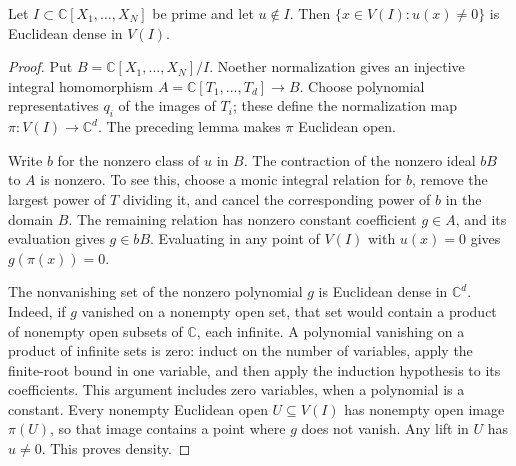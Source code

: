 \begin{lemma}
\label{lem:complex-closure-principal-density}
\leanok
Let $I\subset\mathbb C[X_1,\ldots,X_N]$ be prime and let $u\notin I$.
Then $\{x\in V(I):u(x)\ne0\}$ is Euclidean dense in $V(I)$.
\end{lemma}
\begin{proof}
Put $B=\mathbb C[X_1,\ldots,X_N]/I$. Noether normalization gives an
injective integral homomorphism $A=\mathbb C[T_1,\ldots,T_d]\to B$.
Choose polynomial representatives $q_i$ of the images of $T_i$;
these define the normalization map $\pi:V(I)\to\mathbb C^d$.
The preceding lemma makes $\pi$ Euclidean open.

Write $b$ for the nonzero class of $u$ in $B$. The contraction of the
nonzero ideal $bB$ to $A$ is nonzero. To see this, choose a monic integral
relation for $b$, remove the largest power of $T$ dividing it, and cancel
the corresponding power of $b$ in the domain $B$. The remaining relation
has nonzero constant coefficient $g\in A$, and its evaluation gives
$g\in bB$. Evaluating in any point of $V(I)$ with $u(x)=0$ gives
$g(\pi(x))=0$.

The nonvanishing set of the nonzero polynomial $g$ is Euclidean dense
in $\mathbb C^d$. Indeed, if $g$ vanished on a nonempty open set,
that set would contain a product of nonempty open subsets of $\mathbb C$,
each infinite. A polynomial vanishing on a product of infinite sets is
zero: induct on the number of variables, apply the finite-root bound in
one variable, and then apply the induction hypothesis to its coefficients.
This argument includes zero variables, when a polynomial is a constant.
Every nonempty Euclidean open $U\subseteq V(I)$ has nonempty open image
$\pi(U)$, so that image contains a point where $g$ does not vanish.
Any lift in $U$ has $u\ne0$. This proves density.
\end{proof}

